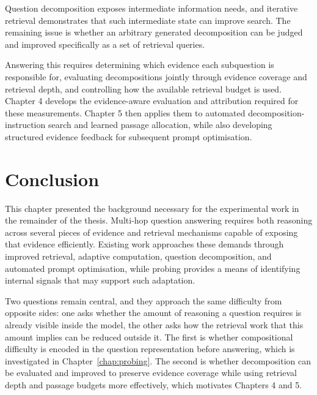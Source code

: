 Question decomposition exposes intermediate information needs, and iterative
retrieval demonstrates that such intermediate state can improve search. The
remaining issue is whether an arbitrary generated decomposition can be judged
and improved specifically as a set of retrieval queries.

\begin{center}
\end{center}

Answering this requires determining which evidence each subquestion is responsible for, evaluating decompositions jointly through evidence coverage and retrieval depth, and controlling how the available retrieval budget is used. Chapter 4 develops the evidence-aware evaluation and attribution required for these measurements. Chapter 5 then applies them to automated decomposition-instruction search and learned passage allocation, while also developing structured evidence feedback for subsequent prompt optimisation.


\section*{Conclusion}
{}

This chapter presented the background necessary for the experimental work in
the remainder of the thesis. Multi-hop question answering requires both
reasoning across several pieces of evidence and retrieval mechanisms capable of
exposing that evidence efficiently. Existing work approaches these demands through improved retrieval, adaptive
computation, question decomposition, and automated prompt optimisation, while
probing provides a means of identifying internal signals that may support such
adaptation.

Two questions remain central, and they approach the same difficulty from
opposite sides: one asks whether the amount of reasoning a question requires is
already visible inside the model, the other asks how the retrieval work that
this amount implies can be reduced outside it. The first is whether
compositional difficulty is encoded in the question representation before
answering, which is investigated in Chapter~\ref{chap:probing}. The second is whether decomposition can be evaluated and improved to preserve evidence coverage while using retrieval depth and passage budgets more effectively, which motivates Chapters 4 and 5.
